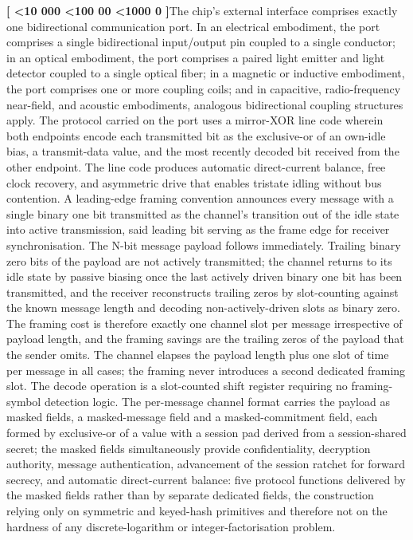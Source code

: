 \documentclass[12pt,letterpaper]{article}
\newcounter{para}
\newcommand{\padzero}{%
  \ifnum\value{para}<10 000\else%
  \ifnum\value{para}<100 00\else%
  \ifnum\value{para}<1000 0\else%
  \fi\fi\fi}
\newcommand{\para}{%
  \refstepcounter{para}\noindent\textbf{[\padzero\arabic{para}]}\hspace{0.5em}\ignorespaces}
\begin{document}
\para The chip's external interface comprises exactly one bidirectional communication port. In an electrical embodiment, the port comprises a single bidirectional input/output pin coupled to a single conductor; in an optical embodiment, the port comprises a paired light emitter and light detector coupled to a single optical fiber; in a magnetic or inductive embodiment, the port comprises one or more coupling coils; and in capacitive, radio-frequency near-field, and acoustic embodiments, analogous bidirectional coupling structures apply. The protocol carried on the port uses a mirror-XOR line code wherein both endpoints encode each transmitted bit as the exclusive-or of an own-idle bias, a transmit-data value, and the most recently decoded bit received from the other endpoint. The line code produces automatic direct-current balance, free clock recovery, and asymmetric drive that enables tristate idling without bus contention. A leading-edge framing convention announces every message with a single binary one bit transmitted as the channel's transition out of the idle state into active transmission, said leading bit serving as the frame edge for receiver synchronisation. The N-bit message payload follows immediately. Trailing binary zero bits of the payload are not actively transmitted; the channel returns to its idle state by passive biasing once the last actively driven binary one bit has been transmitted, and the receiver reconstructs trailing zeros by slot-counting against the known message length and decoding non-actively-driven slots as binary zero. The framing cost is therefore exactly one channel slot per message irrespective of payload length, and the framing savings are the trailing zeros of the payload that the sender omits. The channel elapses the payload length plus one slot of time per message in all cases; the framing never introduces a second dedicated framing slot. The decode operation is a slot-counted shift register requiring no framing-symbol detection logic. The per-message channel format carries the payload as masked fields, a masked-message field and a masked-commitment field, each formed by exclusive-or of a value with a session pad derived from a session-shared secret; the masked fields simultaneously provide confidentiality, decryption authority, message authentication, advancement of the session ratchet for forward secrecy, and automatic direct-current balance: five protocol functions delivered by the masked fields rather than by separate dedicated fields, the construction relying only on symmetric and keyed-hash primitives and therefore not on the hardness of any discrete-logarithm or integer-factorisation problem.
\end{document}
